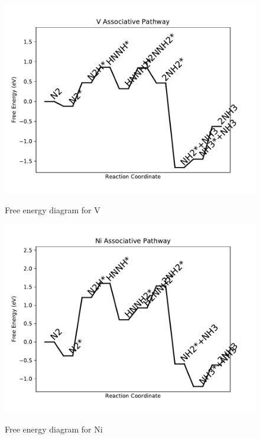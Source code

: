 \documentclass[journal=jacsat,manuscript=article]{achemso}
\begin{document}
\begin{figure}
\includegraphics[width=1\linewidth]{data/plots/V_associative.pdf}
\label{fig:V_associative}
\caption{Free energy diagram for V}
\end{figure}

\newpage
\begin{figure}
\includegraphics[width=1\linewidth]{data/plots/Ni_associative.pdf}
\label{fig:Ni_associative}
\caption{Free energy diagram for Ni}
\end{figure}
\end{document}
